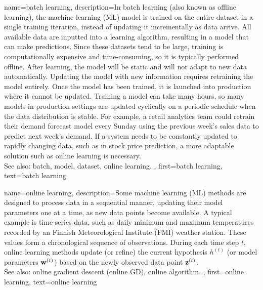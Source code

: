 {
{name={batch learning},
	description={In batch learning (also known as offline learning), the machine learning (ML) model 
		is trained on the entire dataset in a single training iteration, instead of updating it incrementally as data arrive. 
		All available data are inputted into a learning algorithm, resulting in a model that can make predictions. 
		Since these datasets tend to be large, training is computationally expensive and time-consuming, 
		so it is typically performed offline. After learning, the model will be static and will not adapt to new data automatically. 
		Updating the model with new information requires retraining the model entirely. Once the model has been trained, 
		it is launched into production where it cannot be updated. Training a model can take many hours, so many models in production 
		settings are updated cyclically on a periodic schedule when the data distribution is stable. For example, a retail analytics team 
		could retrain their demand forecast model every Sunday using the previous week's sales data to predict next week's demand. 
		If a system needs to be constantly updated to rapidly changing data, such as in stock price prediction, a more adaptable solution 
		such as online learning is necessary.
		\\
		See also: batch, model, dataset, online learning. },
	first={batch learning}, 
	text={batch learning}
}

{name={online learning},
	description={Some machine learning (ML) methods  are designed to process data in a sequential 
		manner, updating their model parameters one at a time, as new data points become available. 
		A typical example is time-series data, such as daily minimum and maximum temperatures 
		recorded by an Finnish Meteorological Institute (FMI) weather station. These values form a chronological sequence 
		of observations. During each time step $t$, online learning methods update (or refine)  
		the current hypothesis $h^{(t)}$ (or model parameters ${\bf w}^{(t)}$) 
		based on the newly observed data point ${\bf z}^{(t)}$. 
		\\ 
		See also: online gradient descent (online GD), online algorithm. },
	first={online learning},
	text={online learning} 
}

}
